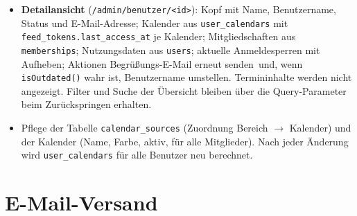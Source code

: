 \documentclass[a4paper,fontsize=10pt]{scrartcl}
\newcommand{\code}[1]{\texttt{#1}}
\begin{document}
\begin{itemize}
        Kalender aus \code{user\_calendars} (Name und Farbe; in der
        Liste die ersten drei, der Rest als \glqq +n\grqq). Der Name
        verlinkt auf die Detailansicht. Sortierbar nach jeder Spalte
        (Namen nach deutscher Sortierung); Filter
        \glqq nie angemeldet\grqq, \glqq Begrüßungslink nie
        aufgerufen\grqq, \glqq kein Abruf seit $n$ Tagen\grqq,
        \glqq gesperrt\grqq, kombinierbar mit einem Filter nach Kalender
        (\code{?kalender=<slug>}) und einer Suche nach Name oder
        Benutzername. Die Abfrage erfolgt über \code{users} mit
        Aggregationen über \code{feed\_tokens} und \code{user\_calendars};
        bei rund 200 Benutzern ist keine Paginierung nötig.
  \item \textbf{Detailansicht} (\code{/admin/benutzer/<id>}): Kopf mit Name,
        Benutzername, Status und E-Mail-Adresse; Kalender aus
        \code{user\_calendars} mit \code{feed\_tokens.last\_access\_at}
        je Kalender; Mitgliedschaften aus \code{memberships}; Nutzungsdaten
        aus \code{users}; aktuelle Anmeldesperren mit \glqq Aufheben\grqq;
        Aktionen \glqq Begrüßungs-E-Mail erneut
        senden\grqq\ und, wenn \code{isOutdated()} wahr ist,
        \glqq Benutzername umstellen\grqq. Termininhalte werden nicht
        angezeigt. Filter und Suche der Übersicht bleiben über die
        Query-Parameter beim Zurückspringen erhalten.
  \item Pflege der Tabelle \code{calendar\_sources} (Zuordnung Bereich
        $\rightarrow$ Kalender) und der Kalender (Name, Farbe, aktiv,
        \glqq für alle Mitglieder\grqq). Nach jeder Änderung wird
        \code{user\_calendars} für alle Benutzer neu berechnet.
\end{itemize}

\section{E-Mail-Versand}\label{sec:mail}
\end{document}
